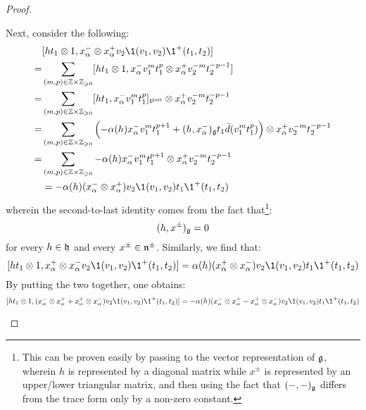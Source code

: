 \begin{proof}
\begin{enumerate}
\begin{enumerate}
                        Next, consider the following:
                            $$
                                \begin{aligned}
                                    & [ht_1 \tensor 1, x_{\alpha}^- \tensor x_{\alpha}^+ v_2\1(v_1, v_2) \1^+(t_1, t_2)]
                                    \\
                                    = & \sum_{(m, p) \in \Z \x \Z_{\geq 0}} [ht_1 \tensor 1, x_{\alpha}^- v_1^m t_1^p \tensor x_{\alpha}^+ v_2^{-m} t_2^{-p - 1}]
                                    \\
                                    = & \sum_{(m, p) \in \Z \x \Z_{\geq 0}} [ht_1, x_{\alpha}^- v_1^m t_1^p]_{\toroidal^{\positive}} \tensor x_{\alpha}^+ v_2^{-m} t_2^{-p - 1}
                                    \\
                                    = & \sum_{(m, p) \in \Z \x \Z_{\geq 0}} \left( -\alpha(h) x_{\alpha}^- v_1^m t_1^{p + 1} + (h, x_{\alpha}^-)_{\g} t_1 \bar{d}(v_1^m t_1^p) \right) \tensor x_{\alpha}^+ v_2^{-m} t_2^{-p - 1}
                                    \\
                                    = & \sum_{(m, p) \in \Z \x \Z_{\geq 0}} -\alpha(h) x_{\alpha}^- v_1^m t_1^{p + 1} \tensor x_{\alpha}^+ v_2^{-m} t_2^{-p - 1}
                                    \\
                                    & = -\alpha(h) ( x_{\alpha}^- \tensor x_{\alpha}^+ ) v_2 \1(v_1, v_2) t_1 \1^+(t_1, t_2)
                                \end{aligned}    
                            $$
                        wherein the second-to-last identity comes from the fact that\footnote{This can be proven easily by passing to the vector representation of $\mathfrak{g}$, wherein $h$ is represented by a diagonal matrix while $x^{\pm}$ is represented by an upper/lower triangular matrix, and then using the fact that $(-, -)_{\mathfrak{g}}$ differs from the trace form only by a non-zero constant.}:
                            $$(h, x^{\pm})_{\mathfrak{g}} = 0$$
                        for every $h \in \mathfrak{h}$ and every $x^{\pm} \in \mathfrak{n}^{\pm}$. Similarly, we find that:
                            $$[ht_1 \tensor 1, x_{\alpha}^+ \tensor x_{\alpha}^- v_2\1(v_1, v_2) \1^+(t_1, t_2)] = \alpha(h) ( x_{\alpha}^+ \tensor x_{\alpha}^- ) v_2 \1(v_1, v_2) t_1 \1^+(t_1, t_2)$$
                        By putting the two together, one obtains:
                            $$[h t_1 \tensor 1, (x_{\alpha}^- \tensor x_{\alpha}^+ + x_{\alpha}^+ \tensor x_{\alpha}^-) v_2\1(v_1, v_2) \1^+(t_1, t_2)] = -\alpha(h) ( x_{\alpha}^- \tensor x_{\alpha}^+ - x_{\alpha}^+ \tensor x_{\alpha}^- ) v_2 \1(v_1, v_2) t_1 \1^+(t_1, t_2)$$

\end{enumerate}
\end{enumerate}
\end{proof}
